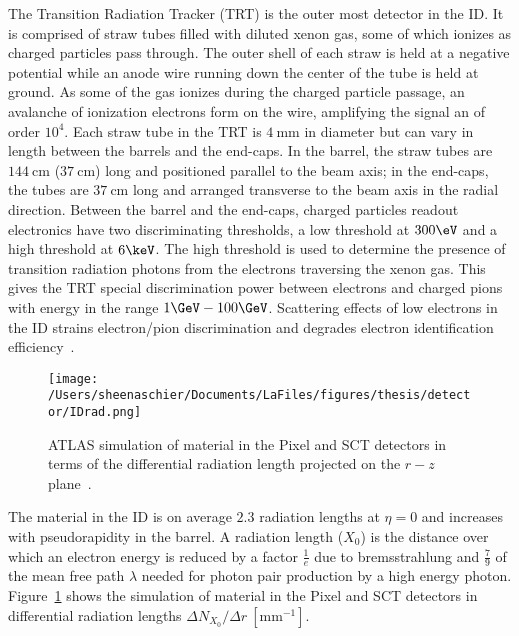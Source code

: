 The Transition Radiation Tracker (TRT) is the outer most detector in the ID.  It is comprised of straw tubes filled with diluted xenon gas, some of which ionizes as charged particles pass through.   The outer shell of each straw is held at a negative potential while an anode wire running down the center of the tube is held at ground.  As some of the gas ionizes during the charged particle passage, an avalanche of ionization electrons form on the wire, amplifying the signal an of order $10^4$. Each straw tube in the TRT is $4~\mathrm{mm}$ in diameter but can vary in length between the barrels and the end-caps.  In the barrel, the straw tubes are $144~\mathrm{cm}$ ($37~\mathrm{cm}$) long and positioned parallel to the beam axis; in the end-caps, the tubes are $37~\mathrm{cm}$ long and arranged transverse to the beam axis in the radial direction.  %
Between the barrel and the end-caps, charged particles readout electronics have two discriminating thresholds, a low threshold at $300\eV$ and a high threshold at $6\keV$.  The high threshold is used to determine the presence of transition radiation photons from the electrons traversing the xenon gas.  This gives the TRT special discrimination power between electrons and charged pions with energy in the range $1\GeV - 100\GeV$.  Scattering effects of low \pt electrons in the ID strains electron/pion discrimination and degrades electron identification efficiency~\cite{MINDUR2017257}.  

  \begin{figure}[tbp]
  \centering
 \texttt{[image: /Users/sheenaschier/Documents/LaFiles/figures/thesis/detector/IDrad.png]}
    \caption{ATLAS simulation of material in the Pixel and SCT detectors in terms of the differential radiation length projected on the $r-z$ plane~\cite{Aaboud:2017pjd}.}
   \label{fig:IDmat}
 \end{figure}
 The material in the ID is on average $2.3$ radiation lengths at $\eta=0$ and increases with pseudorapidity in the barrel.  A radiation length ($X_0$) is the distance over which an electron energy is reduced by a factor $\frac{1}{e}$ due to bremsstrahlung and $\frac{7}{9}$ of the mean free path $\lambda$ needed for photon pair production by a high energy photon.  Figure~\ref{fig:IDmat} shows the simulation of material in the Pixel and SCT detectors in differential radiation lengths $\Delta N_{X_0}/\Delta r~[\mathrm{mm}^{-1}]$.
\FloatBarrier

